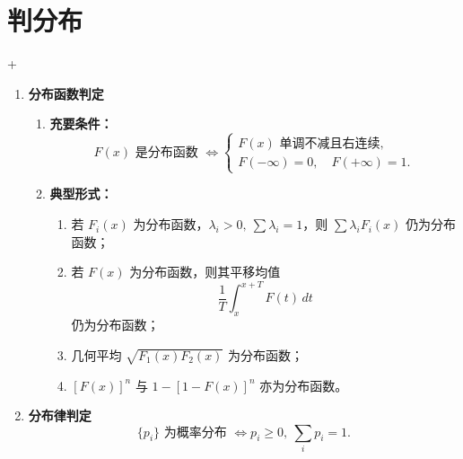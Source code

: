 
\section{判分布}
\DOne + \DTwoTwo

\begin{enumerate}
      \item \textbf{分布函数判定}
            \begin{enumerate}
                  \item \textbf{充要条件：}
                        \[
                              F(x)\text{ 是分布函数 } \Leftrightarrow
                              \begin{cases}
                                    F(x) \text{ 单调不减且右连续}, \\
                                    F(-\infty)=0,\quad F(+\infty)=1.
                              \end{cases}
                        \]

                  \item \textbf{典型形式：}
                        \begin{enumerate}
                              \item 若 $F_i(x)$ 为分布函数，$\lambda_i>0,\ \sum\lambda_i=1$，则 $\sum\lambda_iF_i(x)$ 仍为分布函数；
                              \item 若 $F(x)$ 为分布函数，则其平移均值
                                    \[
                                          \frac{1}{T}\int_x^{x+T}F(t)\,dt
                                    \]
                                    仍为分布函数；
                              \item 几何平均 $\sqrt{F_1(x)F_2(x)}$ 为分布函数；
                              \item $[F(x)]^n$ 与 $1-[1-F(x)]^n$ 亦为分布函数。
                        \end{enumerate}
            \end{enumerate}

      \item \textbf{分布律判定}
            \[
                  \{p_i\}\text{ 为概率分布 } \Leftrightarrow p_i\ge0,\ \sum_i p_i=1.
            \]


\end{enumerate}
